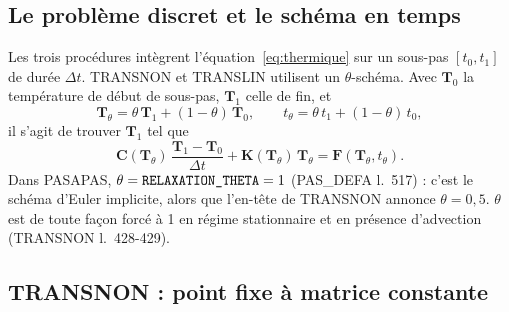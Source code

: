 \documentclass[11pt,a4paper]{article}
\numberwithin{equation}{section}
\newcommand{\src}[1]{\texttt{\detokenize{#1}}}          %
\newcommand{\pr}[1]{\textsf{#1}}                        %
\newcommand{\lig}[1]{l.~#1}
\newcommand{\vc}[1]{\symbf{#1}}                         %
\begin{document}
\subsection{Le problème discret et le schéma en temps}

Les trois procédures intègrent l'équation~\eqref{eq:thermique} sur un sous-pas $[t_0, t_1]$ de durée $\Delta t$.
\pr{TRANSNON} et \pr{TRANSLIN} utilisent un $\theta$-schéma.
Avec $\vc T_0$ la température de début de sous-pas, $\vc T_1$ celle de fin, et
\begin{equation}
\vc T_\theta = \theta\,\vc T_1 + (1-\theta)\,\vc T_0,\qquad t_\theta = \theta\,t_1 + (1-\theta)\,t_0,
\end{equation}
il s'agit de trouver $\vc T_1$ tel que
\begin{equation}
\label{eq:theta}
\vc C(\vc T_\theta)\,\frac{\vc T_1 - \vc T_0}{\Delta t} + \vc K(\vc T_\theta)\,\vc T_\theta = \vc F(\vc T_\theta, t_\theta).
\end{equation}
Dans \pr{PASAPAS}, $\theta = \src{RELAXATION_THETA} = 1$ (\pr{PAS\_DEFA} \lig{517}) : c'est le schéma d'Euler implicite, alors que l'en-tête de \pr{TRANSNON} annonce $\theta = 0{,}5$.
$\theta$ est de toute façon forcé à 1 en régime stationnaire et en présence d'advection (\pr{TRANSNON} \lig{428-429}).

\subsection{TRANSNON : point fixe à matrice constante}
\label{sec:transnon}
\end{document}
